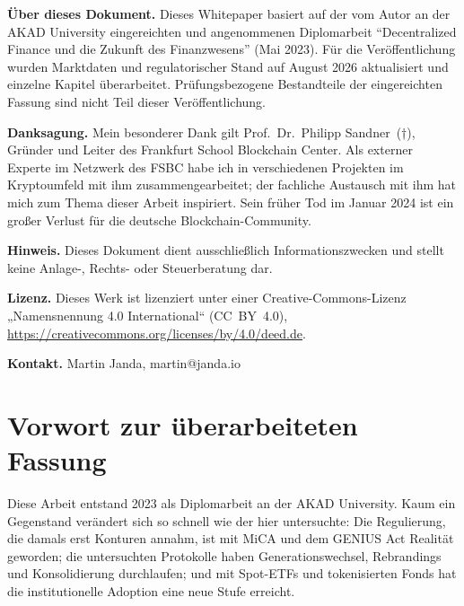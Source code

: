 \documentclass[12pt,a4paper,oneside,BCOR=0mm]{scrreprt}
\begin{document}
\thispagestyle{empty}
\vspace*{\fill}
\noindent
\begin{minipage}{\textwidth}\small
  \textbf{Über dieses Dokument.} Dieses Whitepaper basiert auf der vom Autor
  an der AKAD University eingereichten und angenommenen Diplomarbeit
  \enquote{Decentralized Finance und die Zukunft des Finanzwesens} (Mai 2023).
  Für die Veröffentlichung wurden Marktdaten und regulatorischer Stand auf
  August 2026 aktualisiert und einzelne Kapitel überarbeitet. Prüfungsbezogene
  Bestandteile der eingereichten Fassung sind nicht Teil dieser
  Veröffentlichung.

  \medskip
  \textbf{Danksagung.} Mein besonderer Dank gilt Prof.~Dr.~Philipp Sandner~(†),
  Gründer und Leiter des Frankfurt School Blockchain Center. Als externer
  Experte im Netzwerk des FSBC habe ich in verschiedenen Projekten
  im Kryptoumfeld mit ihm zusammengearbeitet; der fachliche Austausch mit ihm hat mich
  zum Thema dieser Arbeit inspiriert. Sein früher Tod im Januar 2024 ist ein
  großer Verlust für die deutsche Blockchain-Community.

  \medskip
  \textbf{Hinweis.} Dieses Dokument dient ausschließlich Informationszwecken
  und stellt keine Anlage-, Rechts- oder Steuerberatung dar.

  \medskip
  \textbf{Lizenz.} Dieses Werk ist lizenziert unter einer Creative-Commons-Lizenz
  „Namensnennung 4.0 International“ (CC~BY~4.0),
  \url{https://creativecommons.org/licenses/by/4.0/deed.de}.

  \medskip
  \textbf{Kontakt.} Martin Janda, martin@janda.io
\end{minipage}
\vspace*{\fill}
\clearpage

\chapter*{Vorwort zur überarbeiteten Fassung}

Diese Arbeit entstand 2023 als Diplomarbeit an der AKAD University. Kaum ein
Gegenstand verändert sich so schnell wie der hier untersuchte: Die Regulierung,
die damals erst Konturen annahm, ist mit MiCA und dem GENIUS Act Realität
geworden; die untersuchten Protokolle haben Generationswechsel, Rebrandings
und Konsolidierung durchlaufen; und mit Spot-ETFs und tokenisierten Fonds hat
die institutionelle Adoption eine neue Stufe erreicht.
\end{document}

